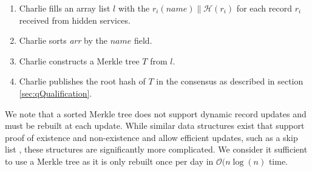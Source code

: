 \documentclass[USenglish,oneside,twocolumn]{article}
\newcommand*\concat{\mathbin{\|}}
\begin{document}
\begin{enumerate}
	\item Charlie fills an array list $ l $ with the $ r_{i}(\mathit{name}) \concat \mathcal{H}(r_{i}) $ for each record $ r_{i} $ received from hidden services.
	\item Charlie sorts \emph{arr} by the $ \mathit{name} $ field.
	\item Charlie constructs a Merkle tree $ T $ from $ l $.
	\item Charlie publishes the root hash of $ T $ in the consensus as described in section \ref{sec:qQualification}.
\end{enumerate}

We note that a sorted Merkle tree does not support dynamic record updates and must be rebuilt at each update. While similar data structures exist that support proof of existence and non-existence and allow efficient updates, such as a skip list \cite{goodrich2001implementation}, these structures are significantly more complicated. We consider it sufficient to use a Merkle tree as it is only rebuilt once per day in $ \mathcal{O}(n \log(n) $ time.




\end{document}
